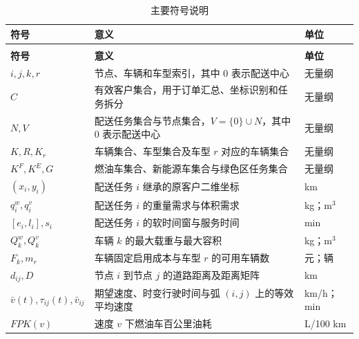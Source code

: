 \documentclass[withoutpreface,bwprint]{cumcmthesis} %
\begin{document}
\begin{xltabular}{0.95\textwidth}{>{\centering\arraybackslash}m{2.6cm}X>{\centering\arraybackslash}m{2.0cm}}
\caption{主要符号说明}
\label{tab:symbols}\\

\toprule
{}
\textbf{符号} & \textbf{意义} & \textbf{单位} \\
\midrule
\endfirsthead

\\
\toprule
{}
\textbf{符号} & \textbf{意义} & \textbf{单位} \\
\midrule
\endhead

\bottomrule
\endfoot

\bottomrule
\endlastfoot

$i,j,k,r$ & 节点、车辆和车型索引，其中 $0$ 表示配送中心 & 无量纲 \\
$C$ & 有效客户集合，用于订单汇总、坐标识别和任务拆分 & 无量纲 \\
$N,V$ & 配送任务集合与节点集合，$V=\{0\}\cup N$，其中 $0$ 表示配送中心 & 无量纲 \\

$K,R,K_r$ & 车辆集合、车型集合及车型 $r$ 对应的车辆集合 & 无量纲 \\
$K^F,K^E,G$ & 燃油车集合、新能源车集合与绿色区任务集合 & 无量纲 \\

$(x_i,y_i)$ & 配送任务 $i$ 继承的原客户二维坐标 & km \\
$q_i^w,q_i^v$ & 配送任务 $i$ 的重量需求与体积需求 & kg；$\mathrm{m}^3$ \\

$[e_i,l_i],s_i$ & 配送任务 $i$ 的软时间窗与服务时间 & min \\
$Q_k^w,Q_k^v$ & 车辆 $k$ 的最大载重与最大容积 & kg；$\mathrm{m}^3$ \\

$F_k,m_r$ & 车辆固定启用成本与车型 $r$ 的可用车辆数 & 元；辆 \\
$d_{ij},D$ & 节点 $i$ 到节点 $j$ 的道路距离及距离矩阵 & km \\

$\bar v(t),\tau_{ij}(t),\bar v_{ij}$ & 期望速度、时变行驶时间与弧 $(i,j)$ 上的等效平均速度 & km/h；min \\
$FPK(v)$ & 速度 $v$ 下燃油车百公里油耗 & L/100 km \\


\end{xltabular}
\end{document}
